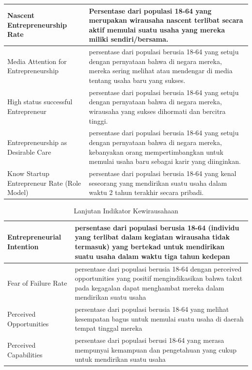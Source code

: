 \begin{table}[H]
\begin{tabular}{|p{4cm}|p{10cm}|}
\hline
Nascent Entrepreneurship Rate & Persentase dari populasi 18-64 yang merupakan wirausaha nascent terlibat secara aktif memulai suatu usaha yang mereka miliki sendiri/bersama.\\
\hline
Media Attention for Entrepreneurship & persentase dari populasi berusia 18-64 yang setuju dengan pernyataan bahwa di negara mereka, mereka sering melihat atau mendengar di media tentang usaha baru yang sukses.\\
\hline
High status successful Entrepreneur & persentase dari populasi berusia 18-64 yang setuju dengan pernyataan bahwa di negara mereka, wirausaha yang sukses dihormati dan bercitra tinggi.\\
\hline
Entrepreneurship as Desirable Care & persentase dari populasi berusia 18-64 yang setuju dengan pernyataan bahwa di negara mereka, kebanyakan orang mempertimbangkan untuk memulai usaha baru sebagai karir yang diinginkan.\\
\hline
Know Startup Entrepreneur Rate (Role Model)& persentase dari populasi berusia 18-64 yang kenal seseorang yang mendirikan suatu usaha dalam waktu 2 tahun terakhir secara pribadi.\\
\hline
\end{tabular}
\label{tabelindikator2}
\end{table}

\begin{table} [H]
\centering
\caption{Lanjutan Indikator Kewirausahaan}
\begin{tabular}{|p{4cm}|p{10cm}|}
\hline
Entrepreneurial Intention & persentase dari populasi berusia 18-64 (individu yang terlibat dalam kegiatan wirausaha tidak termasuk) yang bertekad untuk mendirikan suatu usaha dalam waktu tiga tahun kedepan\\
\hline
Fear of Failure Rate & persentase dari populasi berusia 18-64 dengan perceived opportunities yang positif mengindikasikan bahwa takut pada kegagalan dapat menghambat mereka dalam mendirikan suatu usaha\\
\hline
Perceived Opportunities & persentase dari populasi berusia 18-64 yang melihat kesempatan bagus untuk memulai suatu usaha di daerah tempat tinggal mereka\\
\hline
Perceived Capabilities & persentase dari populasi berusi 18-64 yang merasa mempunyai kemampuan dan pengetahuan yang cukup untuk mendirikan suatu usaha\\
\hline
\end{tabular}
\label{tabelindikator3}
\end{table}

